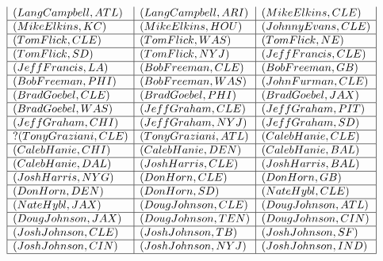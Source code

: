 \documentclass{ximera}
\begin{document}
\begin{center}
\[\begin{array}{|l|l|l|}
(Lang Campbell, ATL) & (Lang Campbell, ARI) & (Mike Elkins, CLE) \\\hline 


(Mike Elkins, KC) & (Mike Elkins, HOU) & (Johnny Evans, CLE) \\\hline 


(Tom Flick, CLE) & (Tom Flick, WAS) &  (Tom Flick, NE) \\\hline  


(Tom Flick, SD) & (Tom Flick, NYJ) & (Jeff Francis, CLE) \\\hline 


(Jeff Francis, LA) & (Bob Freeman, CLE) & (Bob Freeman, GB) \\\hline 


(Bob Freeman, PHI) & (Bob Freeman, WAS) & (John Furman, CLE) \\\hline 


(Brad Goebel, CLE) & (Brad Goebel, PHI) & (Brad Goebel, JAX) \\\hline 


(Brad Goebel, WAS) & (Jeff Graham, CLE) & (Jeff Graham, PIT) \\\hline 


(Jeff Graham, CHI) & (Jeff Graham, NYJ) & (Jeff Graham, SD) \\\hline ?

(Tony Graziani, CLE) & (Tony Graziani, ATL) & (Caleb Hanie, CLE) \\\hline 


(Caleb Hanie, CHI) & (Caleb Hanie, DEN) & (Caleb Hanie, BAL) \\\hline 


(Caleb Hanie, DAL) & (Josh Harris, CLE) & (Josh Harris, BAL) \\\hline 


(Josh Harris, NYG) & (Don Horn, CLE) & (Don Horn, GB) \\\hline 


(Don Horn, DEN) & (Don Horn, SD) & (Nate Hybl, CLE) \\\hline 


(Nate Hybl, JAX) & (Doug Johnson, CLE) & (Doug Johnson, ATL) \\\hline 


(Doug Johnson, JAX) & (Doug Johnson, TEN) & (Doug Johnson, CIN) \\\hline


(Josh Johnson, CLE) & (Josh Johnson, TB) & (Josh Johnson, SF) \\\hline 


(Josh Johnson, CIN) & (Josh Johnson, NYJ) & (Josh Johnson, IND) \\\hline 



\end{array}\]
\end{center}
\end{document}
